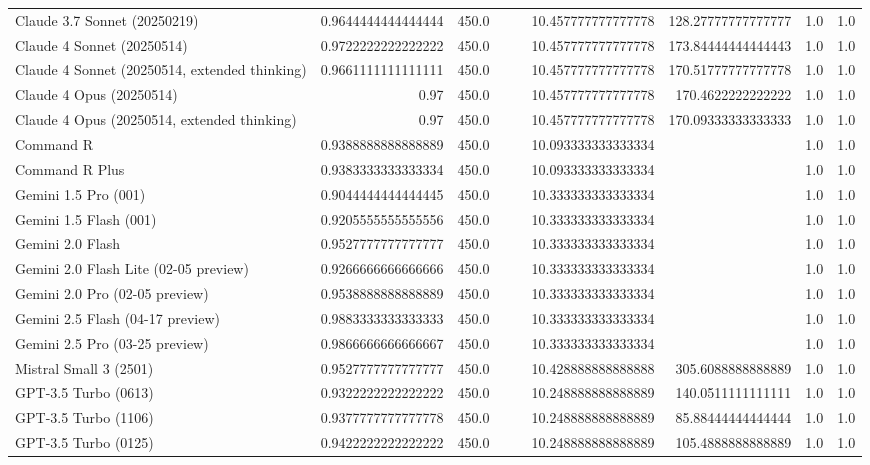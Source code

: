 \begin{table}[htp]
{\begin{tabular}{lrrrrrrrr}
Claude 3.7 Sonnet (20250219) & 0.9644444444444444 & 450.0 &  &  & 10.457777777777778 & 128.27777777777777 & 1.0 & 1.0 \\
Claude 4 Sonnet (20250514) & 0.9722222222222222 & 450.0 &  &  & 10.457777777777778 & 173.84444444444443 & 1.0 & 1.0 \\
Claude 4 Sonnet (20250514, extended thinking) & 0.9661111111111111 & 450.0 &  &  & 10.457777777777778 & 170.51777777777778 & 1.0 & 1.0 \\
Claude 4 Opus (20250514) & 0.97 & 450.0 &  &  & 10.457777777777778 & 170.4622222222222 & 1.0 & 1.0 \\
Claude 4 Opus (20250514, extended thinking) & 0.97 & 450.0 &  &  & 10.457777777777778 & 170.09333333333333 & 1.0 & 1.0 \\
Command R & 0.9388888888888889 & 450.0 &  &  & 10.093333333333334 &  & 1.0 & 1.0 \\
Command R Plus & 0.9383333333333334 & 450.0 &  &  & 10.093333333333334 &  & 1.0 & 1.0 \\
Gemini 1.5 Pro (001) & 0.9044444444444445 & 450.0 &  &  & 10.333333333333334 &  & 1.0 & 1.0 \\
Gemini 1.5 Flash (001) & 0.9205555555555556 & 450.0 &  &  & 10.333333333333334 &  & 1.0 & 1.0 \\
Gemini 2.0 Flash & 0.9527777777777777 & 450.0 &  &  & 10.333333333333334 &  & 1.0 & 1.0 \\
Gemini 2.0 Flash Lite (02-05 preview) & 0.9266666666666666 & 450.0 &  &  & 10.333333333333334 &  & 1.0 & 1.0 \\
Gemini 2.0 Pro (02-05 preview) & 0.9538888888888889 & 450.0 &  &  & 10.333333333333334 &  & 1.0 & 1.0 \\
Gemini 2.5 Flash (04-17 preview) & 0.9883333333333333 & 450.0 &  &  & 10.333333333333334 &  & 1.0 & 1.0 \\
Gemini 2.5 Pro (03-25 preview) & 0.9866666666666667 & 450.0 &  &  & 10.333333333333334 &  & 1.0 & 1.0 \\
Mistral Small 3 (2501) & 0.9527777777777777 & 450.0 &  &  & 10.428888888888888 & 305.6088888888889 & 1.0 & 1.0 \\
GPT-3.5 Turbo (0613) & 0.9322222222222222 & 450.0 &  &  & 10.248888888888889 & 140.0511111111111 & 1.0 & 1.0 \\
GPT-3.5 Turbo (1106) & 0.9377777777777778 & 450.0 &  &  & 10.248888888888889 & 85.88444444444444 & 1.0 & 1.0 \\
GPT-3.5 Turbo (0125) & 0.9422222222222222 & 450.0 &  &  & 10.248888888888889 & 105.4888888888889 & 1.0 & 1.0 \\

\end{tabular}}
\end{table}
